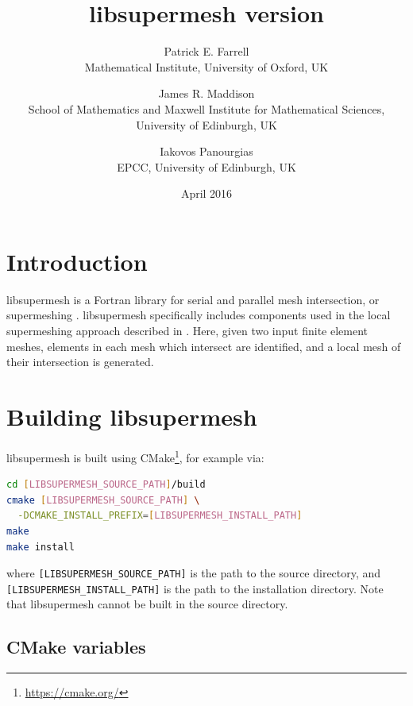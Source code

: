 \documentclass{article}
\begin{document}
\title{libsupermesh version \version}
\date{April 2016}
\author{Patrick E. Farrell \\ Mathematical Institute, University of Oxford, UK \\
   \and James R. Maddison \\ School of Mathematics and Maxwell Institute for Mathematical Sciences, \\ University of Edinburgh, UK \\
   \and Iakovos Panourgias \\ EPCC, University of Edinburgh, UK}

\maketitle

\tableofcontents

\section{Introduction}

libsupermesh is a Fortran library for serial and parallel mesh intersection, or
supermeshing \citep{farrell2009,farrell2009a}. libsupermesh specifically
includes components used in the local supermeshing approach described in
\citet{farrell2011} \citep[see also][]{gander2009,gander2013}. Here, given two
input finite element meshes, elements in each mesh which intersect are
identified, and a local mesh of their intersection is generated.

\section{Building libsupermesh}

libsupermesh is built using CMake\footnote{\url{https://cmake.org/}}, for
example via:
\begin{lstlisting}[language=sh,frame=single]
cd [LIBSUPERMESH_SOURCE_PATH]/build
cmake [LIBSUPERMESH_SOURCE_PATH] \
  -DCMAKE_INSTALL_PREFIX=[LIBSUPERMESH_INSTALL_PATH]
make
make install
\end{lstlisting}
where \verb+[LIBSUPERMESH_SOURCE_PATH]+ is the path to the source directory, and
\linebreak \verb+[LIBSUPERMESH_INSTALL_PATH]+ is the path to the installation
directory. Note that libsupermesh cannot be built in the source directory.

\subsection*{CMake variables}
\end{document}

